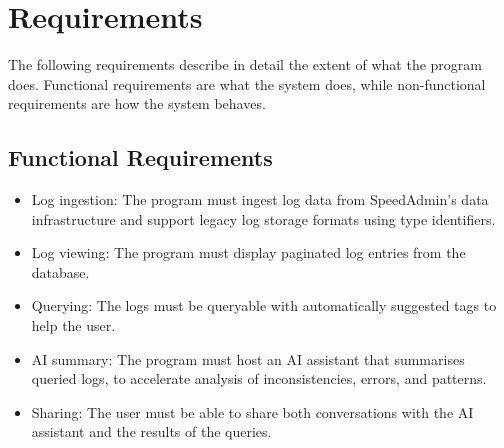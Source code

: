 \section{Requirements} \label{sec:requirements}
The following requirements describe in detail the extent of what the program does. Functional requirements are what the system does, while non-functional requirements are how the system behaves.
\subsection{Functional Requirements}
\begin{itemize}
    \item Log ingestion: The program must ingest log data from SpeedAdmin’s data infrastructure and support legacy log storage formats using type identifiers.
    \item Log viewing: The program must display paginated log entries from the database.
    \item Querying: The logs must be queryable with automatically suggested tags to help the user.
    \item AI summary: The program must host an AI assistant that summarises queried logs, to accelerate analysis of inconsistencies, errors, and patterns.
    \item Sharing: The user must be able to share both conversations with the AI assistant and the results of the queries.
\end{itemize}
